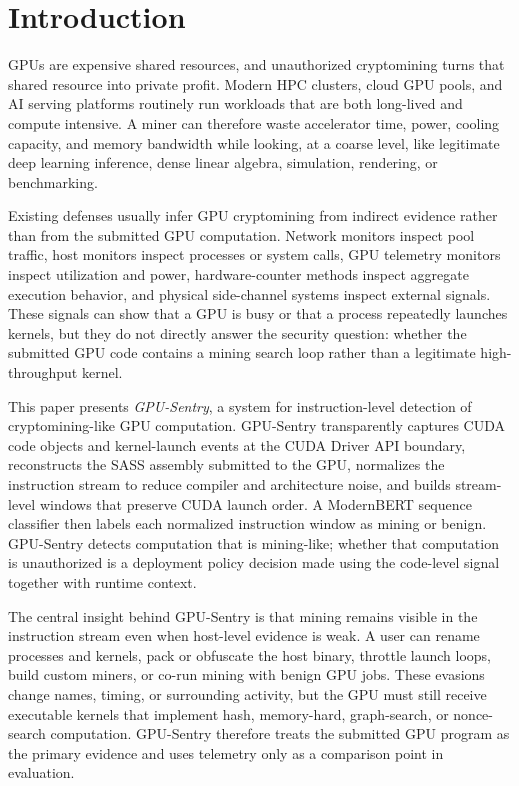 \section{Introduction}

GPUs are expensive shared resources, and unauthorized cryptomining turns that shared resource into private profit. Modern HPC clusters, cloud GPU pools, and AI serving platforms routinely run workloads that are both long-lived and compute intensive. A miner can therefore waste accelerator time, power, cooling capacity, and memory bandwidth while looking, at a coarse level, like legitimate deep learning inference, dense linear algebra, simulation, rendering, or benchmarking.

Existing defenses usually infer GPU cryptomining from indirect evidence rather than from the submitted GPU computation. Network monitors inspect pool traffic, host monitors inspect processes or system calls, GPU telemetry monitors inspect utilization and power, hardware-counter methods inspect aggregate execution behavior, and physical side-channel systems inspect external signals. These signals can show that a GPU is busy or that a process repeatedly launches kernels, but they do not directly answer the security question: whether the submitted GPU code contains a mining search loop rather than a legitimate high-throughput kernel.

This paper presents \textit{GPU-Sentry}, a system for instruction-level detection of cryptomining-like GPU computation. GPU-Sentry transparently captures CUDA code objects and kernel-launch events at the CUDA Driver API boundary, reconstructs the SASS assembly submitted to the GPU, normalizes the instruction stream to reduce compiler and architecture noise, and builds stream-level windows that preserve CUDA launch order. A ModernBERT sequence classifier then labels each normalized instruction window as mining or benign. GPU-Sentry detects computation that is mining-like; whether that computation is unauthorized is a deployment policy decision made using the code-level signal together with runtime context.

The central insight behind GPU-Sentry is that mining remains visible in the instruction stream even when host-level evidence is weak. A user can rename processes and kernels, pack or obfuscate the host binary, throttle launch loops, build custom miners, or co-run mining with benign GPU jobs. These evasions change names, timing, or surrounding activity, but the GPU must still receive executable kernels that implement hash, memory-hard, graph-search, or nonce-search computation. GPU-Sentry therefore treats the submitted GPU program as the primary evidence and uses telemetry only as a comparison point in evaluation.

